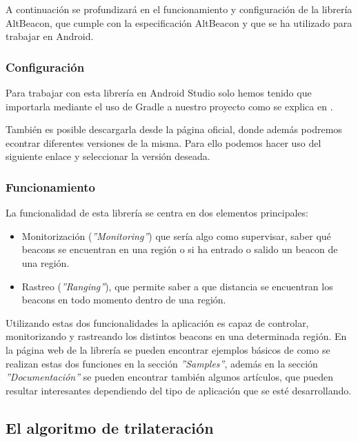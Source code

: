 A continuación se profundizará en el funcionamiento y configuración de la librería AltBeacon, que cumple con la especificación AltBeacon y que se ha utilizado para trabajar en Android.

\subsubsection{Configuración}

Para trabajar con esta librería en Android Studio solo hemos tenido que importarla mediante el uso de Gradle a nuestro proyecto como se explica en \cite{URL::importGradle}.


También es posible descargarla desde la página oficial, donde además podremos econtrar diferentes versiones de la misma. Para ello podemos hacer uso del siguiente enlace \cite{URL::versionAltBeacon} y seleccionar la versión deseada.


\subsubsection{Funcionamiento}

La funcionalidad de esta librería se centra en dos elementos principales: 

\begin{itemize}
\item Monitorización (\textit{''Monitoring''}) que sería algo como supervisar, saber qué beacons se encuentran en una región o si ha entrado o salido un beacon de una región.
\item Rastreo (\textit{''Ranging''}), que permite saber a que distancia se encuentran los beacons en todo momento dentro de una región.
\end{itemize}

Utilizando estas dos funcionalidades la aplicación es capaz de controlar, monitorizando y rastreando los distintos beacons en una determinada región. En la página web de la librería \cite{URL::altbeaconSamples} se pueden encontrar ejemplos básicos de como se realizan estas dos funciones en la sección \textit{''Samples''}, además en la sección \textit{''Documentación''} se pueden encontrar también algunos artículos, que pueden resultar interesantes dependiendo del tipo de aplicación que se esté desarrollando.


\subsection{El algoritmo de trilateración}


